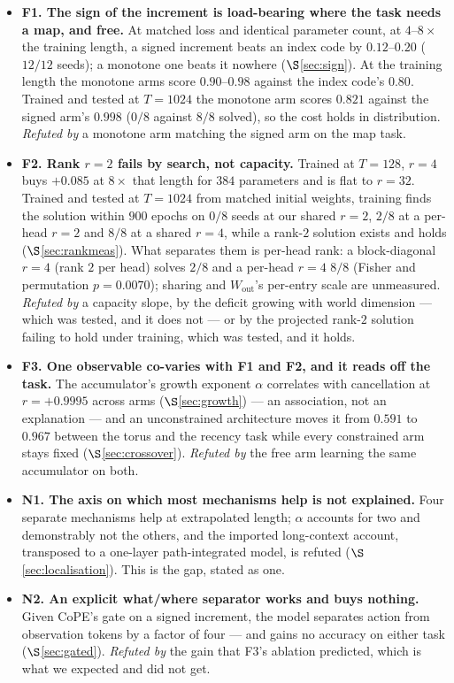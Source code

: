 \documentclass[11pt]{article}
\begin{document}
\begin{itemize}\itemsep2pt
\item \textbf{F1. The sign of the increment is load-bearing where the task needs a
  map, and free.} At matched loss and identical parameter
  count, at $4$--$8\times$ the training length, a signed increment beats an index code
  by $0.12$--$0.20$ ($12/12$ seeds); a monotone one beats it nowhere
  ($\S$\ref{sec:sign}). At the training length the monotone arms score $0.90$--$0.98$
  against the index code's $0.80$. Trained and tested at $T=1024$ the monotone arm
  scores $0.821$ against the signed arm's $0.998$ ($0/8$ against $8/8$ solved), so the
  cost holds in distribution. \emph{Refuted by} a monotone arm matching the signed arm on the map
  task.
\item \textbf{F2. Rank $r=2$ fails by search, not capacity.} Trained at $T=128$,
  $r=4$ buys $+0.085$ at $8\times$ that length for $384$ parameters and is flat to
  $r=32$. Trained and tested at $T=1024$ from matched initial weights, training finds
  the solution within $900$ epochs on $0/8$ seeds at our shared $r=2$, $2/8$ at a
  per-head $r=2$ and $8/8$ at a shared $r=4$, while a rank-$2$ solution exists and holds
  ($\S$\ref{sec:rankmeas}). What separates them is per-head rank: a block-diagonal $r=4$
  (rank $2$ per head) solves $2/8$ and a per-head $r=4$ $8/8$ (Fisher and permutation
  $p=0.0070$); sharing and $W_{\mathrm{out}}$'s per-entry scale are unmeasured.
  \emph{Refuted by} a capacity slope, by the deficit growing with world dimension ---
  which was tested, and it does not --- or by the projected rank-$2$ solution failing
  to hold under training, which was tested, and it holds.
\item \textbf{F3. One observable co-varies with F1 and F2, and it reads off the
  task.} The accumulator's growth exponent $\alpha$ correlates with cancellation at
  $r = +0.9995$ across arms ($\S$\ref{sec:growth}) --- an association, not an
  explanation --- and an unconstrained architecture moves it from $0.591$ to $0.967$
  between the torus and the recency task while every constrained arm stays fixed
  ($\S$\ref{sec:crossover}).
  \emph{Refuted by} the free arm learning the same accumulator on both.
\item \textbf{N1. The axis on which most mechanisms help is not explained.} Four
  separate mechanisms help at extrapolated length; $\alpha$ accounts for two and
  demonstrably not the others, and the imported long-context account, transposed to
  a one-layer path-integrated model, is refuted ($\S$\ref{sec:localisation}). This is the gap, stated as one.
\item \textbf{N2. An explicit what/where separator works and buys nothing.} Given
  CoPE's gate on a signed increment, the model separates action from observation
  tokens by a factor of four --- and gains no accuracy on either task
  ($\S$\ref{sec:gated}). \emph{Refuted by} the gain that F3's ablation predicted,
  which is what we expected and did not get.
\end{itemize}
\end{document}
